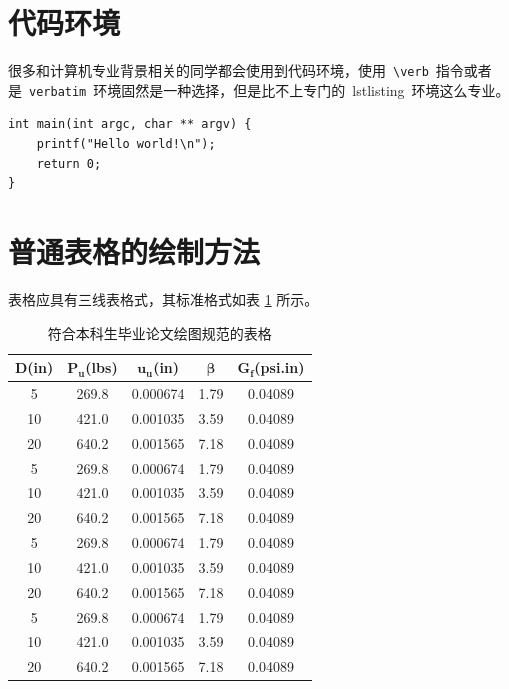\section{代码环境}

很多和计算机专业背景相关的同学都会使用到代码环境，使用~\verb|\verb|~指令或者是~\verb|verbatim|~环境固然是一种选择，但是比不上专门的~lstlisting~环境这么专业。

\begin{lstlisting}
int main(int argc, char ** argv) {
    printf("Hello world!\n");
    return 0;
}
\end{lstlisting}

\section{普通表格的绘制方法}

表格应具有三线表格式，其标准格式如表 \ref{tab:table1} 所示。
\begin{table}[htbp]
\caption{符合本科生毕业论文绘图规范的表格}\label{tab:table1}
\vspace{0.5em}\centering\wuhao
\begin{tabular}{ccccc}
\toprule[1.5pt]
\textbf{ $\pmb{D}$(in)} & \textbf{ $\pmb{P_u}$(lbs)} & \textbf{ $\pmb{u_u}$(in)} & \textbf{ $\pmb{\beta}$} & \textbf{$\pmb{G_f}$(psi.in) }\\
\midrule[1pt]
 5 & 269.8 & 0.000674 & 1.79 & 0.04089\\
10 & 421.0 & 0.001035 & 3.59 & 0.04089\\
20 & 640.2 & 0.001565 & 7.18 & 0.04089\\
 5 & 269.8 & 0.000674 & 1.79 & 0.04089\\
10 & 421.0 & 0.001035 & 3.59 & 0.04089\\
20 & 640.2 & 0.001565 & 7.18 & 0.04089\\
 5 & 269.8 & 0.000674 & 1.79 & 0.04089\\
10 & 421.0 & 0.001035 & 3.59 & 0.04089\\
20 & 640.2 & 0.001565 & 7.18 & 0.04089\\
 5 & 269.8 & 0.000674 & 1.79 & 0.04089\\
10 & 421.0 & 0.001035 & 3.59 & 0.04089\\
20 & 640.2 & 0.001565 & 7.18 & 0.04089\\
\bottomrule[1.5pt]
\end{tabular}
\vspace{\baselineskip}
\end{table}

